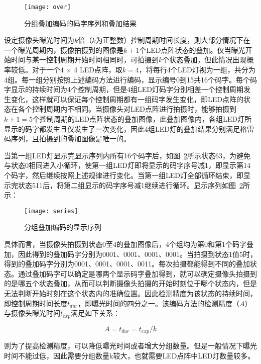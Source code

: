 \begin{figure}[h] 
  \centering
  \texttt{[image: over]}
  \caption{分组叠加编码的码字序列和叠加结果}
  \label{over}
\end{figure}

设定摄像头曝光时间为$k$倍（$k$为正整数）控制周期时间长度，则大部分情况下在一个曝光周期内，摄像拍摄到的图像是$k + 1$个LED点阵状态的叠加。仅当曝光开始时间与某一控制周期开始时间相同时，可拍摄到$k$个状态叠加，但此情况出现概率较低。对于一个4 × 4 LED点阵，取$k = 4$，将每行4个LED灯视为一组，共分为4组。每一组分别按照上述编码方法进行编码，显示编号0到15共16个码字。每个码字显示的持续时间为4个控制周期，但是4组LED灯码字分别相差一个控制周期发生变化，这样就可以保证每个控制周期都有一组码字发生变化，即LED点阵的状态在各个控制周期内不相同。当摄像头对LED点阵进行拍摄时，能够拍摄到$k + 1 = 5$个控制周期的LED点阵状态的叠加图像，此叠加图像内，各组LED灯所显示的码字都发生且仅发生了一次变化，因此4组LED灯的叠加结果分别满足格雷码序列，且拍摄到的叠加图像是唯一的。

当第一组LED灯显示完显示序列内所有16个码字后，如图~\ref{series}所示状态63，为避免与状态0相同进入小循环，使第一组LED灯即将显示的码字序号减1，即显示第14个码字，然后继续按照上述规律进行变化。当第一组LED灯全部循环结束，即显示完状态511后，将第二组显示的码字序号减1继续进行循环。显示序列如图~\ref{series}所示：

\begin{figure}[h] 
  \centering
  \texttt{[image: series]}
  \caption{分组叠加编码的显示序列}
  \label{series}
\end{figure}

具体而言，当摄像头拍摄到状态0至4的叠加图像后，4个组均为第0和第1个码字叠加，因此得到的叠加码字分别为0001、0001、0001、0001。当拍摄到状态1值5时，得到的叠加码字分别为0001、0001、0001、0011。每次拍摄都能得到不同的叠加状态。通过叠加码字可以确定是哪两个显示码字叠加得到，就可以确定摄像头拍摄到的是哪五个状态叠加，从而可以判断摄像头拍摄的开始时刻位于哪个状态内，但是无法判断开始时刻在这个状态内的准确位置。因此检测精度为该状态的持续时间，即控制周期时间长度$t_{dur}$，即曝光时间的四分之一。该编码方法的检测精度（$A$）与摄像头曝光时间$t_{exp}$满足如下关系：

\begin{equation}
A = t_{dur} = t_{exp} / k
\end{equation}

则为了提高检测精度，可以降低曝光时间或者增大分组数量。但是一般情况下曝光时间不能过低，因此需要分组数量k较大，也就需要LED点阵中LED灯数量较多。

